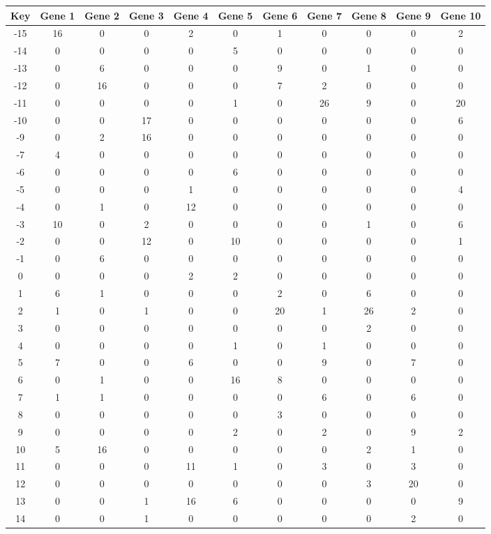 \begin{tabular}{|c|c|c|c|c|c|c|c|c|c|c|}
\hline
Key & Gene 1 & Gene 2 & Gene 3 & Gene 4 & Gene 5 & Gene 6 & Gene 7 & Gene 8 & Gene 9 & Gene 10 \\
\hline
-15 & 16 & 0 & 0 & 2 & 0 & 1 & 0 & 0 & 0 & 2 \\
-14 & 0 & 0 & 0 & 0 & 5 & 0 & 0 & 0 & 0 & 0 \\
-13 & 0 & 6 & 0 & 0 & 0 & 9 & 0 & 1 & 0 & 0 \\
-12 & 0 & 16 & 0 & 0 & 0 & 7 & 2 & 0 & 0 & 0 \\
-11 & 0 & 0 & 0 & 0 & 1 & 0 & 26 & 9 & 0 & 20 \\
-10 & 0 & 0 & 17 & 0 & 0 & 0 & 0 & 0 & 0 & 6 \\
-9 & 0 & 2 & 16 & 0 & 0 & 0 & 0 & 0 & 0 & 0 \\
-7 & 4 & 0 & 0 & 0 & 0 & 0 & 0 & 0 & 0 & 0 \\
-6 & 0 & 0 & 0 & 0 & 6 & 0 & 0 & 0 & 0 & 0 \\
-5 & 0 & 0 & 0 & 1 & 0 & 0 & 0 & 0 & 0 & 4 \\
-4 & 0 & 1 & 0 & 12 & 0 & 0 & 0 & 0 & 0 & 0 \\
-3 & 10 & 0 & 2 & 0 & 0 & 0 & 0 & 1 & 0 & 6 \\
-2 & 0 & 0 & 12 & 0 & 10 & 0 & 0 & 0 & 0 & 1 \\
-1 & 0 & 6 & 0 & 0 & 0 & 0 & 0 & 0 & 0 & 0 \\
0 & 0 & 0 & 0 & 2 & 2 & 0 & 0 & 0 & 0 & 0 \\
1 & 6 & 1 & 0 & 0 & 0 & 2 & 0 & 6 & 0 & 0 \\
2 & 1 & 0 & 1 & 0 & 0 & 20 & 1 & 26 & 2 & 0 \\
3 & 0 & 0 & 0 & 0 & 0 & 0 & 0 & 2 & 0 & 0 \\
4 & 0 & 0 & 0 & 0 & 1 & 0 & 1 & 0 & 0 & 0 \\
5 & 7 & 0 & 0 & 6 & 0 & 0 & 9 & 0 & 7 & 0 \\
6 & 0 & 1 & 0 & 0 & 16 & 8 & 0 & 0 & 0 & 0 \\
7 & 1 & 1 & 0 & 0 & 0 & 0 & 6 & 0 & 6 & 0 \\
8 & 0 & 0 & 0 & 0 & 0 & 3 & 0 & 0 & 0 & 0 \\
9 & 0 & 0 & 0 & 0 & 2 & 0 & 2 & 0 & 9 & 2 \\
10 & 5 & 16 & 0 & 0 & 0 & 0 & 0 & 2 & 1 & 0 \\
11 & 0 & 0 & 0 & 11 & 1 & 0 & 3 & 0 & 3 & 0 \\
12 & 0 & 0 & 0 & 0 & 0 & 0 & 0 & 3 & 20 & 0 \\
13 & 0 & 0 & 1 & 16 & 6 & 0 & 0 & 0 & 0 & 9 \\
14 & 0 & 0 & 1 & 0 & 0 & 0 & 0 & 0 & 2 & 0 \\
\hline
\end{tabular}